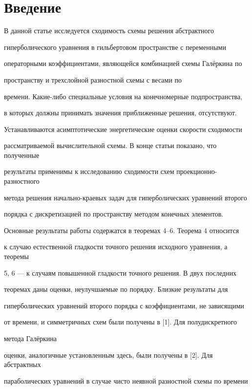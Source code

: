 \section*{Введение}





В данной статье исследуется сходимость схемы решения абстрактного


гиперболического уравнения в гильбертовом пространстве с переменными


операторными коэффициентами, являющейся комбинацией схемы Гал\"еркина по


пространству и трехслойной разностной схемы с весами по


времени. Какие-либо специальные условия на конечномерные подпространства,


в которых должны принимать значения приближенные решения, отсутствуют.


Устанавливаются асимптотические энергетические оценки скорости сходимости


рассматриваемой вычислительной схемы. В конце статьи показано, что полученные


результаты применимы к исследованию сходимости схем проекционно-разностного


метода решения начально-краевых задач для гиперболических уравнений второго


порядка с дискретизацией по пространству методом конечных элементов.





Основные результаты работы содержатся в теоремах 4--6. Теорема 4 относится


к случаю естественной гладкости точного решения исходного уравнения, а теоремы


5, 6 --- к случаям повышенной гладкости точного решения. В двух последних


теоремах даны оценки, неулучшаемые по порядку. Близкие результаты для


гиперболических уравнений второго порядка с коэффициентами, не зависящими


от времени, и симметричных схем были получены в [1]. Для полудискретного


метода Гал\"еркина


оценки, аналогичные установленным здесь, были получены в [2]. Для абстрактных


параболических уравнений в случае чисто неявной разностной схемы по времени


